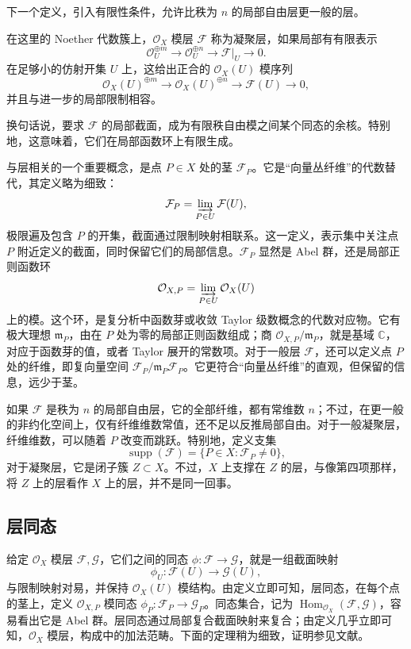 下一个定义，引入有限性条件，允许比秩为 $n$ 的局部自由层更一般的层。
\begin{definition*}\label{def:4.coherent-sheaf}
在这里的 Noether 代数簇上，$\mathcal{O}_X$ 模层 $\mathcal{F}$ 称为凝聚层，如果局部有有限表示
\[
\mathcal{O}_U^{\oplus m}\longrightarrow\mathcal{O}_U^{\oplus n}
\longrightarrow\mathcal{F}|_U\longrightarrow0.
\]
在足够小的仿射开集 $U$ 上，这给出正合的 $\mathcal{O}_X(U)$ 模序列
\[
\mathcal{O}_X(U)^{\oplus m}\longrightarrow\mathcal{O}_X(U)^{\oplus n}
\longrightarrow\mathcal{F}(U)\longrightarrow0,
\]
并且与进一步的局部限制相容。
\end{definition*}
换句话说，要求 $\mathcal{F}$ 的局部截面，成为有限秩自由模之间某个同态的余核。特别地，这意味着，它们在局部函数环上有限生成。

与层相关的一个重要概念，是点 $P\in X$ 处的茎 $\mathcal{F}_P$。它是“向量丛纤维”的代数替代，其定义略为细致：
\[
\mathcal{F}_P=\varinjlim_{P\in U}\mathcal{F}(U),
\]
极限遍及包含 $P$ 的开集，截面通过限制映射相联系。这一定义，表示集中关注点 $P$ 附近定义的截面，同时保留它们的局部信息。$\mathcal{F}_P$ 显然是 Abel 群，还是局部正则函数环
\[
\mathcal{O}_{X,P}=\varinjlim_{P\in U}\mathcal{O}_X(U)
\]
上的模。这个环，是复分析中函数芽或收敛 Taylor 级数概念的代数对应物。它有极大理想 $\mathfrak m_P$，由在 $P$ 处为零的局部正则函数组成；商 $\mathcal{O}_{X,P}/\mathfrak m_P$，就是基域 $\mathbb{C}$，对应于函数芽的值，或者 Taylor 展开的常数项。对于一般层 $\mathcal{F}$，还可以定义点 $P$ 处的纤维，即复向量空间 $\mathcal{F}_P/\mathfrak m_P\mathcal{F}_P$。它更符合“向量丛纤维”的直观，但保留的信息，远少于茎。

如果 $\mathcal{F}$ 是秩为 $n$ 的局部自由层，它的全部纤维，都有常维数 $n$；不过，在更一般的非约化空间上，仅有纤维维数常值，还不足以反推局部自由。对于一般凝聚层，纤维维数，可以随着 $P$ 改变而跳跃。特别地，定义支集
\[
\operatorname{supp}(\mathcal{F})=\{P\in X:\mathcal{F}_P\ne0\},
\]
对于凝聚层，它是闭子簇 $Z\subset X$。不过，$X$ 上支撑在 $Z$ 的层，与像第四项那样，将 $Z$ 上的层看作 $X$ 上的层，并不是同一回事。

\subsection{层同态}\label{sec:4.3.3}

给定 $\mathcal{O}_X$ 模层 $\mathcal{F},\mathcal{G}$，它们之间的同态 $\phi\colon\mathcal{F}\to\mathcal{G}$，就是一组截面映射
\[
\phi_U\colon\mathcal{F}(U)\longrightarrow\mathcal{G}(U),
\]
与限制映射对易，并保持 $\mathcal{O}_X(U)$ 模结构。由定义立即可知，层同态，在每个点的茎上，定义 $\mathcal{O}_{X,P}$ 模同态 $\phi_P\colon\mathcal{F}_P\to\mathcal{G}_P$。同态集合，记为 $\operatorname{Hom}_{\mathcal{O}_X}(\mathcal{F},\mathcal{G})$，容易看出它是 Abel 群。层同态通过局部复合截面映射来复合；由定义几乎立即可知，$\mathcal{O}_X$ 模层，构成中的加法范畴。下面的定理稍为细致，证明参见文献。

